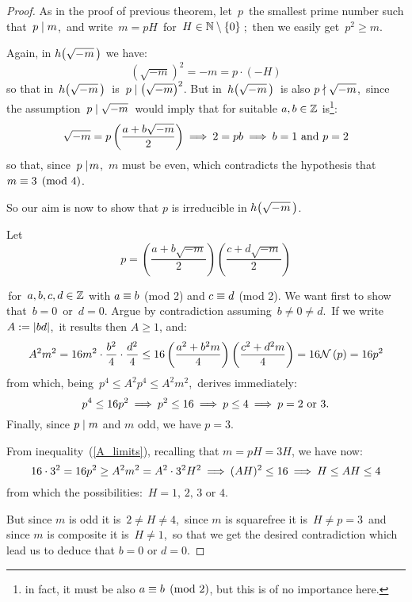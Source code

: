 \begin{proof}
%
As in the proof of previous theorem, let\, $p$\, the
smallest prime number such that\, $p \mid m$,\, and
write\, $m = pH$\, for\, $H \in \mathbb{N}\setminus\left\{0\right\}$\,;\, then we easily
get\, $p^2 \geq m$.

Again, in $\hhm{m}$ we have:
$$
\left(\sqrt{-m}\right)^2 = -m = p\cdot(-H)
$$
so that in\, $\hhm{m}$\, is\, $p \mid \left(\sqrt{-m}\right)^2$.
But in\, $\hhm{m}$\, is also $p \nmid \sqrt{-m}$,\, since the
assumption\, $p \mid \sqrt{-m}$\, would imply that for
suitable $a, b \in \mathbb{Z}$ is\footnote{%
in fact, it must be also $a \equiv b \pmod 2$, but this is
of no importance here.}:
$$
\sqrt{-m} = p\left(\frac{a + b\sqrt{-m}}{2}\right)
\:\Longrightarrow\: 2 = pb \:\Longrightarrow\: b = 1 \textrm{ and } p = 2
$$
so that, since\, $p \mid\! m$,\, $m$ must be even, which
contradicts the hypothesis that $m \equiv 3 \pmod 4$.

So our aim is now to show that $p$ is irreducible in $\hhm{m}$.

Let
\begin{equation}\label{p_factorization}
p = \left(\frac{a + b\sqrt{-m}}{2}\right)
    \left(\frac{c + d\sqrt{-m}}{2}\right)
\end{equation}

\,for\, $a, b, c, d \in \mathbb{Z}$ with
$a \equiv b$ (mod 2) and $c \equiv d$ (mod 2).
We want first to show that\, $b = 0$\, or\, $d = 0$.
Argue by contradiction assuming\, $ b \ne 0 \ne d $.\,
If we write $A := \left|bd\right|$,\, it results then
$A \geq 1$, and:
\begin{equation}\label{A_limits}
A^2 m^2 =
16m^2 \cdot \frac{b^2}{4} \cdot \frac{d^2}{4}
\leq 16 \left(\frac{a^2 + b^2 m}{4}\right)
        \left(\frac{c^2 + d^2 m}{4}\right)
= 16\mathcal{N}\left(p\right) = 16p^2
\end{equation}
from which, being\, $p^4 \leq A^2 p^4 \leq A^2 m^2$,\,
derives immediately:
$$
p^4 \leq 16p^2 \:\Longrightarrow\: p^2 \leq 16 \:\Longrightarrow\: p \leq 4 \:\Longrightarrow\:
p = 2 \textrm{\ or\ } 3.
$$
Finally, since $p \mid m$ and $m$ odd, we have $p=3$.

From inequality~(\ref{A_limits}), recalling that
$m = pH = 3H$, we have now:
$$
16\cdot3^2 = 16p^2 \geq A^2 m^2 = A^2 \cdot 3^2 H^2 \:\Longrightarrow\:
(AH)^2 \leq 16 \:\Longrightarrow\: H \leq AH \leq 4
$$
from which the possibilities:\, $H = 1,\, 2,\, 3$ or $4$.

But since $m$ is odd it is\, $2 \ne H \ne 4$,\, since $m$
is squarefree it is\, $H \ne p = 3$\, and since $m$ is
composite it is\, $H \ne 1$,\, so that we get the desired
contradiction which lead us to deduce that $b=0$ or $d=0$.


\end{proof}
